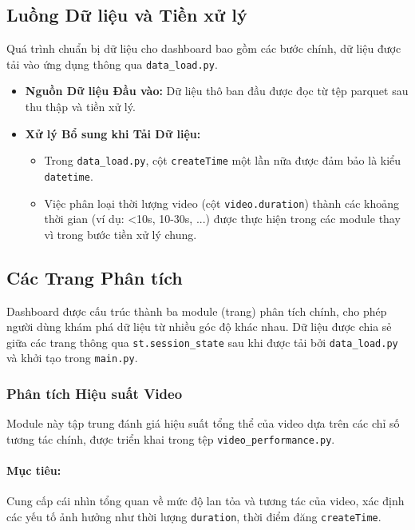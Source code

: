 \subsection{Luồng Dữ liệu và Tiền xử lý}
\noindent
Quá trình chuẩn bị dữ liệu cho dashboard bao gồm các bước chính, dữ liệu được tải vào ứng dụng thông qua \texttt{data\_load.py}.

\begin{itemize}
    \item \textbf{Nguồn Dữ liệu Đầu vào:} Dữ liệu thô ban đầu được đọc từ tệp parquet sau thu thập và tiền xử lý.
    
    \item \textbf{Xử lý Bổ sung khi Tải Dữ liệu:}
        \begin{itemize}
            \item Trong \texttt{data\_load.py}, cột \texttt{createTime} một lần nữa được đảm bảo là kiểu \texttt{datetime}.
            
            \item Việc phân loại thời lượng video (cột \texttt{video.duration}) thành các khoảng thời gian (ví dụ: <10s, 10-30s, ...) được thực hiện trong các module thay vì trong bước tiền xử lý chung.
        \end{itemize}
\end{itemize}

\subsection{Các Trang Phân tích}

Dashboard được cấu trúc thành ba module (trang) phân tích chính, cho phép người dùng khám phá dữ liệu từ nhiều góc độ khác nhau. Dữ liệu được chia sẻ giữa các trang thông qua \texttt{st.session\_state} sau khi được tải bởi \texttt{data\_load.py} và khởi tạo trong \texttt{main.py}.

\subsubsection{Phân tích Hiệu suất Video}

Module này tập trung đánh giá hiệu suất tổng thể của video dựa trên các chỉ số tương tác chính, được triển khai trong tệp \texttt{video\_performance.py}.

\paragraph{Mục tiêu:} Cung cấp cái nhìn tổng quan về mức độ lan tỏa và tương tác của video, xác định các yếu tố ảnh hưởng như thời lượng \texttt{duration}, thời điểm đăng \texttt{createTime}.

